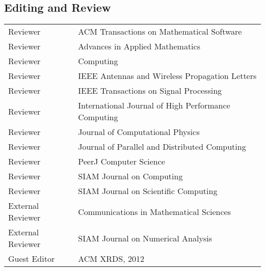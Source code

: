 \documentclass[letterpaper]{article}
\renewenvironment{itemize}{
  \begin{list}{}{
    \setlength{\leftmargin}{1.5em}
  }
}{
  \end{list}
}
\begin{document}
\subsection*{Editing and Review}
\begin{tabular}{ll}
Reviewer & ACM Transactions on Mathematical Software \\
Reviewer & Advances in Applied Mathematics \\
Reviewer & Computing \\
Reviewer & IEEE Antennas and Wireless Propagation Letters \\
Reviewer & IEEE Transactions on Signal Processing \\
Reviewer & International Journal of High Performance Computing \\
Reviewer & Journal of Computational Physics \\
Reviewer & Journal of Parallel and Distributed Computing \\
Reviewer & PeerJ Computer Science \\
Reviewer & SIAM Journal on Computing \\
Reviewer & SIAM Journal on Scientific Computing \\
External Reviewer & Communications in Mathematical Sciences \\
External Reviewer & SIAM Journal on Numerical Analysis \\
Guest Editor & ACM XRDS, 2012
\end{tabular}
\end{document}
